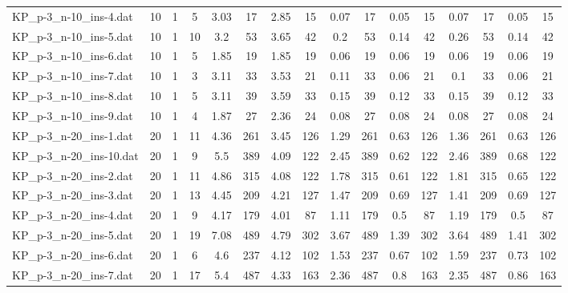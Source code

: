 \begin{sidewaystable}[!ht]
{\begin{tabular}{lccccccccccccccc}
KP\_p-3\_n-10\_ins-4.dat & 10 & 1 & 5 & 3.03 & 17 & 2.85 & 15 & 0.07 & 17 &  \textcolor{blue2}{0.05} & 15 & 0.07 & 17 &  \textcolor{blue2}{0.05} & 15 \\
KP\_p-3\_n-10\_ins-5.dat & 10 & 1 & 10 & 3.2 & 53 & 3.65 & 42 & 0.2 & 53 &  \textcolor{blue2}{0.14} & 42 & 0.26 & 53 &  \textcolor{blue2}{0.14} & 42 \\
KP\_p-3\_n-10\_ins-6.dat & 10 & 1 & 5 & 1.85 & 19 & 1.85 & 19 &  \textcolor{blue2}{0.06} & 19 &  \textcolor{blue2}{0.06} & 19 &  \textcolor{blue2}{0.06} & 19 &  \textcolor{blue2}{0.06} & 19 \\
KP\_p-3\_n-10\_ins-7.dat & 10 & 1 & 3 & 3.11 & 33 & 3.53 & 21 & 0.11 & 33 &  \textcolor{blue2}{0.06} & 21 & 0.1 & 33 &  \textcolor{blue2}{0.06} & 21 \\
KP\_p-3\_n-10\_ins-8.dat & 10 & 1 & 5 & 3.11 & 39 & 3.59 & 33 & 0.15 & 39 & 0.12 & 33 & 0.15 & 39 & 0.12 & 33 \\
KP\_p-3\_n-10\_ins-9.dat & 10 & 1 & 4 & 1.87 & 27 & 2.36 & 24 &  \textcolor{blue2}{0.08} & 27 &  \textcolor{blue2}{0.08} & 24 &  \textcolor{blue2}{0.08} & 27 &  \textcolor{blue2}{0.08} & 24 \\
KP\_p-3\_n-20\_ins-1.dat & 20 & 1 & 11 & 4.36 & 261 & 3.45 & 126 & 1.29 & 261 &  \textcolor{blue2}{0.63} & 126 & 1.36 & 261 &  \textcolor{blue2}{0.63} & 126 \\
KP\_p-3\_n-20\_ins-10.dat & 20 & 1 & 9 & 5.5 & 389 & 4.09 & 122 & 2.45 & 389 &  \textcolor{blue2}{0.62} & 122 & 2.46 & 389 & 0.68 & 122 \\
KP\_p-3\_n-20\_ins-2.dat & 20 & 1 & 11 & 4.86 & 315 & 4.08 & 122 & 1.78 & 315 & 0.61 & 122 & 1.81 & 315 & 0.65 & 122 \\
KP\_p-3\_n-20\_ins-3.dat & 20 & 1 & 13 & 4.45 & 209 & 4.21 & 127 & 1.47 & 209 & 0.69 & 127 & 1.41 & 209 & 0.69 & 127 \\
KP\_p-3\_n-20\_ins-4.dat & 20 & 1 & 9 & 4.17 & 179 & 4.01 & 87 & 1.11 & 179 &  \textcolor{blue2}{0.5} & 87 & 1.19 & 179 &  \textcolor{blue2}{0.5} & 87 \\
KP\_p-3\_n-20\_ins-5.dat & 20 & 1 & 19 & 7.08 & 489 & 4.79 & 302 & 3.67 & 489 & 1.39 & 302 & 3.64 & 489 & 1.41 & 302 \\
KP\_p-3\_n-20\_ins-6.dat & 20 & 1 & 6 & 4.6 & 237 & 4.12 & 102 & 1.53 & 237 &  \textcolor{blue2}{0.67} & 102 & 1.59 & 237 & 0.73 & 102 \\
KP\_p-3\_n-20\_ins-7.dat & 20 & 1 & 17 & 5.4 & 487 & 4.33 & 163 & 2.36 & 487 &  \textcolor{blue2}{0.8} & 163 & 2.35 & 487 & 0.86 & 163 \\

\end{tabular}}
\end{sidewaystable}
